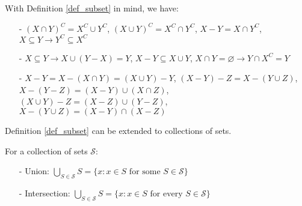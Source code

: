 With Definition \ref{def_subset} in mind, we have:
\begin{enumerate}
    \item[-] $(X\cap Y)^C = X^C\cup Y^C$, $(X\cup Y)^C = X^C\cap Y^C$, $X-Y = X\cap Y^C$, $X\subseteq Y \rightarrow Y^C \subseteq X^C$
    \item[-] $X\subseteq Y \rightarrow X\cup(Y-X)=Y$, $X-Y \subseteq X\cup Y$, $X\cap Y =\varnothing\rightarrow Y\cap X^C=Y$
    \item[-] $X-Y = X-(X\cap Y)=(X\cup Y)-Y$, $(X-Y)-Z=X-(Y\cup Z)$, $X-(Y-Z) = (X-Y)\cup(X\cap Z)$, $(X\cup Y)-Z = (X-Z)\cup(Y-Z)$, $X-(Y\cup Z)=(X-Y)\cap(X-Z)$
\end{enumerate}

Definition \ref{def_subset} can be extended to collections of sets.
\begin{definition}
    For a collection of sets $\mathcal{S}$:
    \begin{enumerate}
        \item[-] Union: $\bigcup_{S\in\mathcal{S}}S=\{x:x\in S \text{ for some } S\in \mathcal{S}\}$
        \item[-] Intersection: $\bigcup_{S\in\mathcal{S}}S=\{x:x\in S \text{ for every } S\in \mathcal{S}\}$
    \end{enumerate}
    \end{definition} 